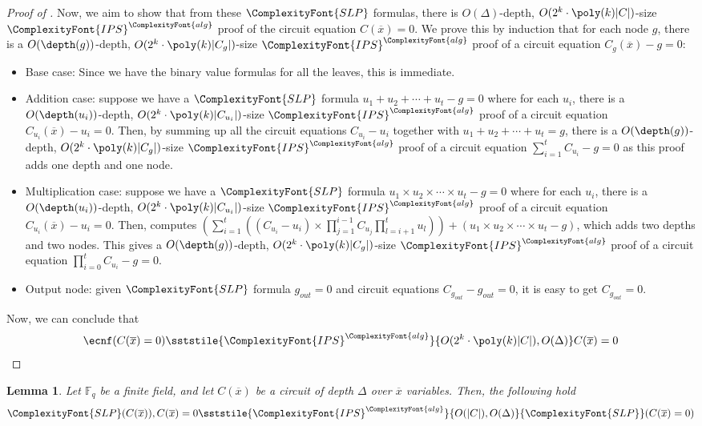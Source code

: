 \documentclass[11pt,letter]{article}
\newtheorem{lemma}[theorem]{Lemma}
\theoremstyle{remark} %
\newcommand{\alg}{\ComplexityFont{alg}}
\newcommand{\IPS}{%
    {
        \ComplexityFont{IPS} 
    }
}
\newcommand{\SLP}{ %
    {
        \ComplexityFont{SLP}
    }
}
\begin{document}
{\begin{proof}[Proof of ]
        Now, we aim to show that from these $\SLP$ formulas, there is $O(\Delta)$-depth, $O(2^k \cdot \poly(k) |C|)$-size $\IPS^\alg$ proof of the circuit equation $C(\overline{x} ) =0$.
        We prove this by induction that for each node $g$, there is a $O(\depth(g))$-depth, $O(2^k \cdot \poly(k) |C_g|)$-size $\IPS^\alg$ proof of a circuit equation $C_g(\overline{x} ) -g =0$:
        \begin{itemize}
            \item Base case: Since we have the binary value formulas for all the leaves, this is immediate.
            \item Addition case: suppose we have a $\SLP$ formula $u_1 + u_2 +\cdots + u_t - g=0$ where for each $u_i$, there is a $O(\depth(u_i))$-depth,  $O(2^k \cdot \poly(k) |C_{u_i}|)$-size $\IPS^\alg$ proof of a circuit equation $C_{u_i}(\overline{x} ) - u_i =0$. Then, by summing up all the circuit equations $C_{u_i}-u_i$ together with $u_1 + u_2 +\cdots + u_t = g$, there is a $O(\depth(g))$-depth, $O(2^k \cdot \poly(k) |C_g|)$-size $\IPS^\alg$ proof of a circuit equation $\sum_{i=1}^t C_{u_i} -g =0$ as this proof adds one depth and one node.
            \item Multiplication case: suppose we have a $\SLP$ formula $u_1 \times u_2 \times \cdots \times u_t - g=0$ where for each $u_i$, there is a $O(\depth(u_i))$-depth,  $O(2^k \cdot \poly(k) |C_{u_i}|)$-size $\IPS^\alg$ proof of a circuit equation $C_{u_i}(\overline{x} ) - u_i =0$. Then, computes $(\sum_{i=1}^t ((C_{u_i}-u_i) \times \prod_{j=1}^{i-1} C_{u_j} \prod_{l=i+1}^t u_l))+ (u_1 \times u_2 \times \cdots \times u_t - g) $, which adds two depths and two nodes. This gives a $O(\depth(g))$-depth, $O(2^k \cdot \poly(k) |C_g|)$-size $\IPS^\alg$ proof of a circuit equation $\prod_{i=0}^t C_{u_i} - g =0$.
            \item Output node: given $\SLP$ formula $g_{out} = 0$ and circuit equations $C_{g_{out}} - g_{out} =0$, it is easy to get $C_{g_{out}}=0$.
        \end{itemize}

        Now, we can conclude that 
        \begin{align*}
            \ecnf(C(\overline{x})=0) \sststile{\IPS^\alg}{O(2^k \cdot \poly(k) |C|),O(\Delta)} C(\overline{x})=0  
        \end{align*}
    \end{proof}
    
    
    
    \begin{lemma}
        \label{lemma: SLP+C = full SLP}
        Let $\mathbb{F}_q$ be a finite field, and let $C(\overline{x})$ be a circuit of depth $\Delta$ over $\overline{x}$ variables. Then, the following hold
        \[
            \SLP(C(\overline{x})) , C(\overline{x}) =0 \sststile{\IPS^\alg}{O(|C|), O(\Delta)} \SLP(C(\overline{x}) =0)
        \]
    \end{lemma}

}
\end{document}
